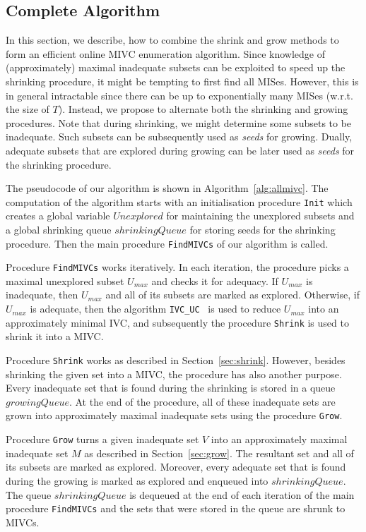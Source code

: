 \subsection{Complete Algorithm}
In this section, we describe, how to combine the shrink and grow methods to form an efficient online MIVC enumeration algorithm.
Since knowledge of (approximately) maximal inadequate subsets can be exploited to speed up the shrinking procedure, it might be tempting to first find all MISes.
However, this is in general intractable since there can be up to exponentially many MISes (w.r.t. the size of $T$).
Instead, we propose to alternate both the shrinking and growing procedures.
Note that during shrinking, we might determine some subsets to be inadequate. Such subsets can be subsequently used as \emph{seeds} for growing.
Dually, adequate subsets that are explored during growing can be later used as \emph{seeds} for the shrinking procedure.

The pseudocode of our algorithm is shown in Algorithm~\ref{alg:allmivc}. The computation of the algorithm starts with an initialisation procedure \texttt{Init} which creates a global variable $\mathit{Unexplored}$ for maintaining the unexplored subsets and a global shrinking queue $\mathit{shrinkingQueue}$ for storing seeds for the shrinking procedure. Then the main procedure \texttt{FindMIVCs} of our algorithm is called.

Procedure \texttt{FindMIVCs} works iteratively. In each iteration, the procedure picks a maximal unexplored subset $U_{max}$ and checks it for adequacy. If $U_{max}$ is inadequate, then $U_{max}$ and all of its subsets are marked as explored. Otherwise, if $U_{max}$ is adequate, then the algorithm \texttt{IVC\_UC}~\cite{Ghass16} is used to reduce $U_{max}$ into an approximately minimal IVC, and subsequently the procedure \texttt{Shrink} is used to shrink it into a MIVC.

Procedure \texttt{Shrink} works as described in Section~\ref{sec:shrink}. However, besides shrinking the given set into a MIVC, the procedure has also another purpose. Every inadequate set that is found during the shrinking is stored in a queue $\mathit{growingQueue}$. At the end of the procedure, all of these inadequate sets are grown into approximately maximal inadequate sets using the procedure \texttt{Grow}.

Procedure \texttt{Grow} turns a given inadequate set $V$ into an approximately maximal inadequate set $M$ as described in Section~\ref{sec:grow}. The resultant set and all of its subsets are marked as explored. Moreover, every adequate set that is found during the growing is marked as explored and enqueued into $\mathit{shrinkingQueue}$.
The queue $\mathit{shrinkingQueue}$ is dequeued at the end of each iteration of the main procedure \texttt{FindMIVCs} and the sets that were stored in the queue are shrunk to MIVCs.   



